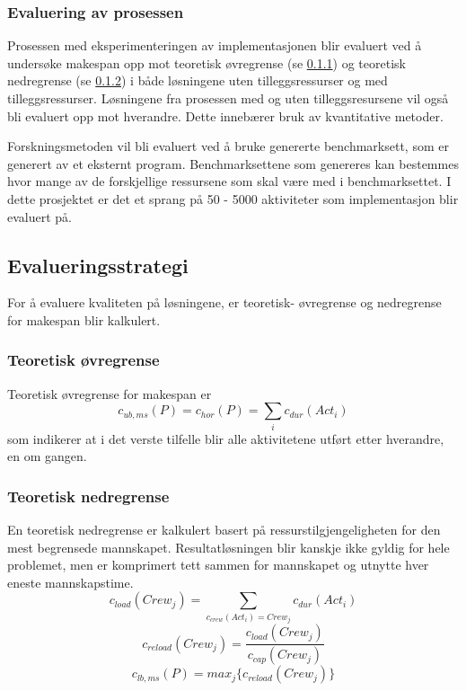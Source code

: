 \subsubsection{Evaluering av prosessen}
Prosessen med eksperimenteringen av implementasjonen blir evaluert ved å undersøke makespan opp mot teoretisk øvregrense (se \ref{sec:teoretiskovre}) og teoretisk nedregrense (se \ref{sec:teoretisknedre}) i både løsningene uten tilleggsressurser og med tilleggsressurser. Løsningene fra prosessen med og uten tilleggsresursene vil også bli evaluert opp mot hverandre. Dette innebærer bruk av kvantitative metoder.

Forskningsmetoden vil bli evaluert ved å bruke genererte benchmarksett, som er generert av et eksternt program. Benchmarksettene som genereres kan bestemmes hvor mange av de forskjellige ressursene som skal være med i benchmarksettet. I dette prosjektet er det et sprang på 50 - 5000 aktiviteter som implementasjon blir evaluert på.

\subsection{Evalueringsstrategi}
\label{sec:strategy}
For å evaluere kvaliteten på løsningene, er teoretisk- øvregrense og nedregrense for makespan blir kalkulert.

\subsubsection{Teoretisk øvregrense}
\label{sec:teoretiskovre}
Teoretisk øvregrense for makespan er
\begin{equation}
c_{ub,ms}(P) = c_{hor}(P) = \sum_{i} c_{dur}(Act_{i})
\end{equation}
som indikerer at i det verste tilfelle blir alle aktivitetene utført etter hverandre, en om gangen.

\subsubsection{Teoretisk nedregrense}
\label{sec:teoretisknedre}
En teoretisk nedregrense er kalkulert basert på ressurstilgjengeligheten for den mest begrensede mannskapet. Resultatløsningen blir kanskje ikke gyldig for hele problemet, men er komprimert tett sammen for mannskapet og utnytte hver eneste mannskapstime.
\begin{equation}
c_{load}(Crew_{j}) = \sum_{c_{crew}(Act_{i}) = Crew_{j}} c_{dur}(Act_{i})
\end{equation}
\begin{equation}
c_{reload}(Crew_{j}) = \frac{c_{load}(Crew_{j})}{c_{cap}(Crew_{j})}
\end{equation}
\begin{equation}
c_{lb,ms}(P) = max_{j}\{ c_{reload}(Crew_{j}) \}
\end{equation}